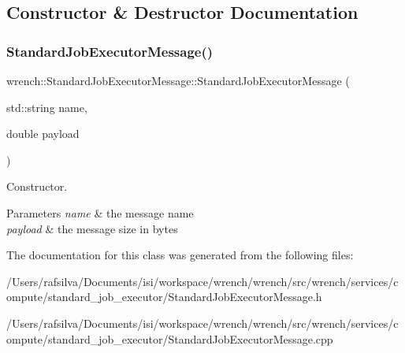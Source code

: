 \subsection{Constructor \& Destructor Documentation}
\mbox{\label{classwrench_1_1_standard_job_executor_message_aa169f57b74f3d18a4a155406deeb5f0b}} 
\subsubsection{\texorpdfstring{Standard\+Job\+Executor\+Message()}{StandardJobExecutorMessage()}}
{\footnotesize\ttfamily wrench\+::\+Standard\+Job\+Executor\+Message\+::\+Standard\+Job\+Executor\+Message (\begin{DoxyParamCaption}\item[{std\+::string}]{name,  }\item[{double}]{payload }\end{DoxyParamCaption})\hspace{0.3cm}{\ttfamily [protected]}}



Constructor. 


\begin{DoxyParams}{Parameters}
{\em name} & the message name \\
\hline
{\em payload} & the message size in bytes \\
\hline
\end{DoxyParams}


The documentation for this class was generated from the following files\+:\begin{DoxyCompactItemize}
\item 
/\+Users/rafsilva/\+Documents/isi/workspace/wrench/wrench/src/wrench/services/compute/standard\+\_\+job\+\_\+executor/Standard\+Job\+Executor\+Message.\+h\item 
/\+Users/rafsilva/\+Documents/isi/workspace/wrench/wrench/src/wrench/services/compute/standard\+\_\+job\+\_\+executor/Standard\+Job\+Executor\+Message.\+cpp\end{DoxyCompactItemize}
